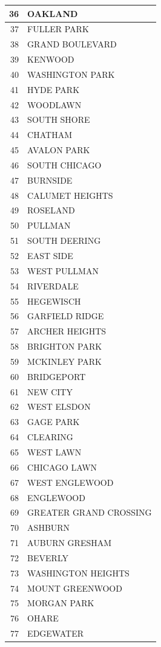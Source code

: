 \documentclass[
]{article}
\begin{document}
\begin{table}
\begin{tabular}[t]{r|l}
\hline
36 & OAKLAND\\
\hline
37 & FULLER PARK\\
\hline
38 & GRAND BOULEVARD\\
\hline
39 & KENWOOD\\
\hline
40 & WASHINGTON PARK\\
\hline
41 & HYDE PARK\\
\hline
42 & WOODLAWN\\
\hline
43 & SOUTH SHORE\\
\hline
44 & CHATHAM\\
\hline
45 & AVALON PARK\\
\hline
46 & SOUTH CHICAGO\\
\hline
47 & BURNSIDE\\
\hline
48 & CALUMET HEIGHTS\\
\hline
49 & ROSELAND\\
\hline
50 & PULLMAN\\
\hline
51 & SOUTH DEERING\\
\hline
52 & EAST SIDE\\
\hline
53 & WEST PULLMAN\\
\hline
54 & RIVERDALE\\
\hline
55 & HEGEWISCH\\
\hline
56 & GARFIELD RIDGE\\
\hline
57 & ARCHER HEIGHTS\\
\hline
58 & BRIGHTON PARK\\
\hline
59 & MCKINLEY PARK\\
\hline
60 & BRIDGEPORT\\
\hline
61 & NEW CITY\\
\hline
62 & WEST ELSDON\\
\hline
63 & GAGE PARK\\
\hline
64 & CLEARING\\
\hline
65 & WEST LAWN\\
\hline
66 & CHICAGO LAWN\\
\hline
67 & WEST ENGLEWOOD\\
\hline
68 & ENGLEWOOD\\
\hline
69 & GREATER GRAND CROSSING\\
\hline
70 & ASHBURN\\
\hline
71 & AUBURN GRESHAM\\
\hline
72 & BEVERLY\\
\hline
73 & WASHINGTON HEIGHTS\\
\hline
74 & MOUNT GREENWOOD\\
\hline
75 & MORGAN PARK\\
\hline
76 & OHARE\\
\hline
77 & EDGEWATER\\
\hline
\end{tabular}
\end{table}
\end{document}
